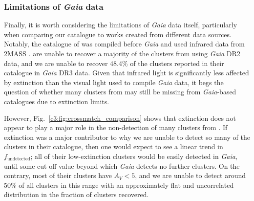 

\subsubsection{Limitations of \emph{Gaia} data}\label{c3:sec:discussion-undetected:methodological-reasons:5-gaia-limitations}

Finally, it is worth considering the limitations of \emph{Gaia} data itself, particularly when comparing our catalogue to works created from different data sources. Notably, the catalogue of \cite{kharchenko_global_2013} was compiled before \emph{Gaia} and used infrared data from 2MASS \citep{skrutskie_two_2006}. \cite{cantat-gaudin_clusters_2020} are unable to recover a majority of the clusters from \cite{kharchenko_global_2013} using \emph{Gaia} DR2 data, and we are unable to recover 48.4\% of the clusters reported in their catalogue in \emph{Gaia} DR3 data. Given that infrared light is significantly less affected by extinction than the visual light used to compile \emph{Gaia} data, it begs the question of whether many clusters from \cite{kharchenko_global_2013} may still be missing from \emph{Gaia}-based catalogues due to extinction limits.

However, Fig.~\ref{c3:fig:crossmatch_comparison} shows that extinction does not appear to play a major role in the non-detection of many clusters from \cite{kharchenko_global_2013}. If extinction was a major contributor to why we are unable to detect so many of the clusters in their catalogue, then one would expect to see a linear trend in $f_\text{undetected}$; all of their low-extinction clusters would be easily detected in \emph{Gaia}, until some cut-off value beyond which \emph{Gaia} detects no further clusters. On the contrary, most of their clusters have $A_V < 5$, and we are unable to detect around 50\% of all clusters in this range with an approximately flat and uncorrelated distribution in the fraction of clusters recovered. 


